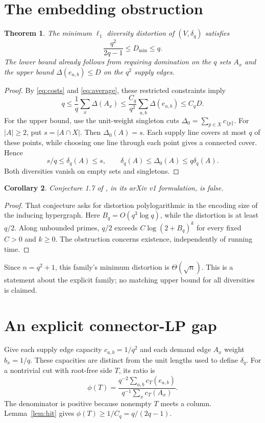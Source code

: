 \documentclass[11pt]{article}
\newtheorem{theorem}{Theorem}
\newtheorem{corollary}[theorem]{Corollary}
\begin{document}
\section{The embedding obstruction}
\begin{theorem}\label{thm:embedding}
The minimum $\ell_1$ diversity distortion of $(V,\delta_q)$ satisfies
\[
 \frac{q^2}{2q-1}\le D_{\min}\le q.
\]
The lower bound already follows from requiring domination on the $q$
sets $A_x$ and the upper bound $\Delta(e_{a,b})\le D$ on the $q^2$
supply edges.
\end{theorem}
\begin{proof}
By \eqref{eq:costs} and \eqref{eq:average}, these restricted constraints imply
\[
 q\le\frac1q\sum_x\Delta(A_x)
   \le\frac{C_q}{q^2}\sum_{a,b}\Delta(e_{a,b})\le C_qD.
\]
For the upper bound, use the unit-weight singleton cuts
$\Delta_0=\sum_{p\in X}c_{\{p\}}$. For $|A|\ge2$, put $s=|A\cap X|$.
Then $\Delta_0(A)=s$. Each supply line covers at most $q$ of these points,
while choosing one line through each point gives a connected cover. Hence
\[
 s/q\le\delta_q(A)\le s,
 \qquad \delta_q(A)\le\Delta_0(A)\le q\delta_q(A).
\]
Both diversities vanish on empty sets and singletons.
\end{proof}

\begin{corollary}
Conjecture 1.7 of \cite{JS}, in its arXiv v1 formulation, is false.
\end{corollary}
\begin{proof}
That conjecture asks for distortion polylogarithmic in the encoding size
of the inducing hypergraph. Here $B_q=O(q^3\log q)$, while the distortion
is at least $q/2$. Along unbounded primes, $q/2$ exceeds
$C\log(2+B_q)^k$ for every fixed $C>0$ and $k\ge0$.
The obstruction concerns existence, independently of running time.
\end{proof}

Since $n=q^2+1$, this family's minimum distortion is $\Theta(\sqrt n)$.
This is a statement about the explicit family; no matching upper bound
for all diversities is claimed.

\section{An explicit connector-LP gap}
Give each supply edge capacity $c_{a,b}=1/q^2$ and each demand edge $A_x$
weight $b_x=1/q$. These capacities are distinct from the unit lengths used
to define $\delta_q$. For a nontrivial cut with root-free side $T$, its ratio is
\[
 \phi(T)=\frac{q^{-2}\sum_{a,b}c_T(e_{a,b})}
                   {q^{-1}\sum_x c_T(A_x)}.
\]
The denominator is positive because nonempty $T$ meets a column.
Lemma~\ref{lem:hit} gives $\phi(T)\ge1/C_q=q/(2q-1)$.
\end{document}
